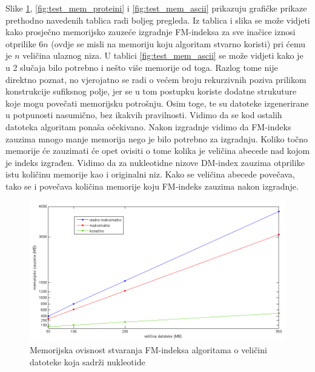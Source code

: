 Slike \ref{fig:test_mem_nukl}, \ref{fig:test_mem_proteini} i \ref{fig:test_mem_ascii} prikazuju grafičke prikaze prethodno navedenih tablica radi boljeg pregleda. Iz tablica i slika se može vidjeti kako prosječno memorijsko zauzeće izgradnje FM-indeksa za sve inačice iznosi otprilike $6n$ (ovdje se misli na memoriju koju algoritam stvarno koristi) pri ćemu je $n$ veličina ulaznog niza. U tablici \ref{fig:test_mem_ascii} se može vidjeti kako je u 2 slučaja bilo potrebno i nešto više memorije od toga. Razlog tome nije direktno poznat, no vjerojatno se radi o većem broju rekurzivnih poziva prilikom konstrukcije sufiksnog polje, jer se u tom postupku koriste dodatne strukuture koje mogu povečati memorijsku potrošnju. Osim toge, te su datoteke izgenerirane u potpunosti nasumično, bez ikakvih pravilnosti. Vidimo da se kod ostalih datoteka algoritam ponaša očekivano. Nakon izgradnje vidimo da FM-indeks zauzima mnogo manje memorija nego je bilo potrebno za izgradnju. Koliko točno memorije će zauzimati će opet ovisiti o tome kolika je veličina abecede nad kojom je indeks izgrađen. Vidimo da za nukleotidne nizove DM-index zauzima otprilike istu količinu memorije kao i originalni niz. Kako se veličina abecede povečava, tako se i povečava količina memorije koju FM-indeks zauzima nakon izgradnje.


\begin{figure}[H]
   \centering
       \includegraphics[width=\textwidth]{./pictures/test_mem_nukl.png}
 \caption{Memorijska ovisnost stvaranja FM-indeksa algoritama o veličini datoteke koja sadrži nukleotide}
 \label{fig:test_mem_nukl}
\end{figure}

